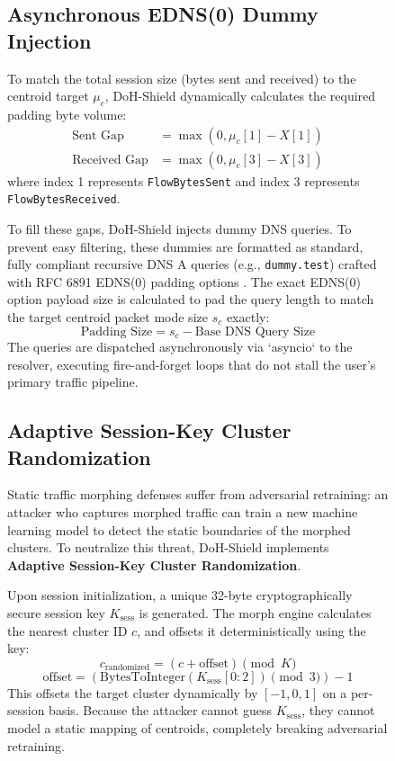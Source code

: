 \documentclass[10pt,journal,compsoc,twocolumn]{IEEEtran}
\begin{document}
\begin{figure}[t]
\subsection{Asynchronous EDNS(0) Dummy Injection}
To match the total session size (bytes sent and received) to the centroid target $\mu_c$, DoH-Shield dynamically calculates the required padding byte volume:
\begin{align}
\text{Sent Gap} &= \max(0, \mu_c[1] - X[1]) \\
\text{Received Gap} &= \max(0, \mu_c[3] - X[3])
\end{align}
where index 1 represents \texttt{FlowBytesSent} and index 3 represents \texttt{FlowBytesReceived}. 

To fill these gaps, DoH-Shield injects dummy DNS queries. To prevent easy filtering, these dummies are formatted as standard, fully compliant recursive DNS A queries (e.g., \texttt{dummy.test}) crafted with RFC 6891 EDNS(0) padding options \cite{rfc6891}. The exact EDNS(0) option payload size is calculated to pad the query length to match the target centroid packet mode size $s_c$ exactly:
\begin{equation}
\text{Padding Size} = s_c - \text{Base DNS Query Size}
\end{equation}
The queries are dispatched asynchronously via `asyncio` to the resolver, executing fire-and-forget loops that do not stall the user's primary traffic pipeline.

\subsection{Adaptive Session-Key Cluster Randomization}
Static traffic morphing defenses suffer from adversarial retraining: an attacker who captures morphed traffic can train a new machine learning model to detect the static boundaries of the morphed clusters. To neutralize this threat, DoH-Shield implements \textbf{Adaptive Session-Key Cluster Randomization}.

Upon session initialization, a unique 32-byte cryptographically secure session key $K_{\text{sess}}$ is generated. The morph engine calculates the nearest cluster ID $c$, and offsets it deterministically using the key:
\begin{equation}
c_{\text{randomized}} = (c + \text{offset}) \pmod K
\end{equation}
\begin{equation}
\text{offset} = (\text{BytesToInteger}(K_{\text{sess}}[0:2]) \pmod 3) - 1
\end{equation}
This offsets the target cluster dynamically by $[-1, 0, 1]$ on a per-session basis. Because the attacker cannot guess $K_{\text{sess}}$, they cannot model a static mapping of centroids, completely breaking adversarial retraining.


\end{figure}
\end{document}
